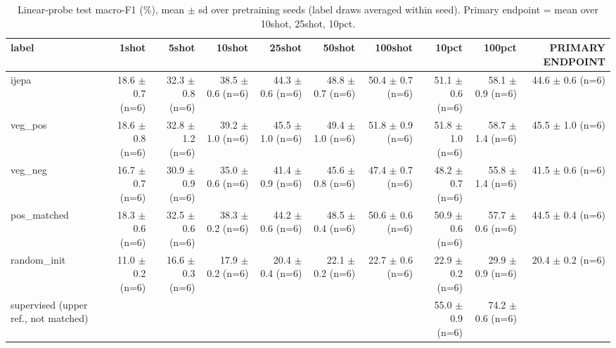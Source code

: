 \begin{table}[t]
\centering
\small
\caption{Linear-probe test macro-F1 (\%), mean $\pm$ sd over pretraining seeds (label draws averaged within seed). Primary endpoint = mean over 10shot, 25shot, 10pct.}
\label{tab:main_results_probe}
\begin{tabular}{lrrrrrrrrr}
\toprule
label & 1shot & 5shot & 10shot & 25shot & 50shot & 100shot & 10pct & 100pct & PRIMARY ENDPOINT \\
\midrule
ijepa & 18.6 $\pm$ 0.7 (n=6) & 32.3 $\pm$ 0.8 (n=6) & 38.5 $\pm$ 0.6 (n=6) & 44.3 $\pm$ 0.6 (n=6) & 48.8 $\pm$ 0.7 (n=6) & 50.4 $\pm$ 0.7 (n=6) & 51.1 $\pm$ 0.6 (n=6) & 58.1 $\pm$ 0.9 (n=6) & 44.6 $\pm$ 0.6 (n=6) \\
veg\_pos & 18.6 $\pm$ 0.8 (n=6) & 32.8 $\pm$ 1.2 (n=6) & 39.2 $\pm$ 1.0 (n=6) & 45.5 $\pm$ 1.0 (n=6) & 49.4 $\pm$ 1.0 (n=6) & 51.8 $\pm$ 0.9 (n=6) & 51.8 $\pm$ 1.0 (n=6) & 58.7 $\pm$ 1.4 (n=6) & 45.5 $\pm$ 1.0 (n=6) \\
veg\_neg & 16.7 $\pm$ 0.7 (n=6) & 30.9 $\pm$ 0.9 (n=6) & 35.0 $\pm$ 0.6 (n=6) & 41.4 $\pm$ 0.9 (n=6) & 45.6 $\pm$ 0.8 (n=6) & 47.4 $\pm$ 0.7 (n=6) & 48.2 $\pm$ 0.7 (n=6) & 55.8 $\pm$ 1.4 (n=6) & 41.5 $\pm$ 0.6 (n=6) \\
pos\_matched & 18.3 $\pm$ 0.6 (n=6) & 32.5 $\pm$ 0.6 (n=6) & 38.3 $\pm$ 0.2 (n=6) & 44.2 $\pm$ 0.6 (n=6) & 48.5 $\pm$ 0.4 (n=6) & 50.6 $\pm$ 0.6 (n=6) & 50.9 $\pm$ 0.6 (n=6) & 57.7 $\pm$ 0.6 (n=6) & 44.5 $\pm$ 0.4 (n=6) \\
random\_init & 11.0 $\pm$ 0.2 (n=6) & 16.6 $\pm$ 0.3 (n=6) & 17.9 $\pm$ 0.2 (n=6) & 20.4 $\pm$ 0.4 (n=6) & 22.1 $\pm$ 0.2 (n=6) & 22.7 $\pm$ 0.6 (n=6) & 22.9 $\pm$ 0.2 (n=6) & 29.9 $\pm$ 0.9 (n=6) & 20.4 $\pm$ 0.2 (n=6) \\
supervised (upper ref., not matched) &  &  &  &  &  &  & 55.0 $\pm$ 0.9 (n=6) & 74.2 $\pm$ 0.6 (n=6) &  \\
\bottomrule
\end{tabular}
\end{table}
